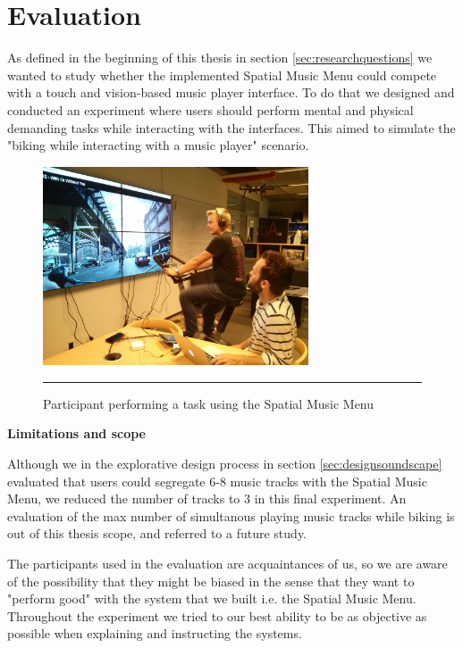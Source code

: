 \chapter{Evaluation}
\label{sec:evaluation}
As defined in the beginning of this thesis in section \ref{sec:researchquestions} we wanted to study whether the implemented Spatial Music Menu could compete with a touch and vision-based music player interface. To do that we designed and conducted an experiment where users should perform mental and physical demanding tasks while interacting with the interfaces. This aimed to simulate the "biking while interacting with a music player" scenario.

\begin{figure}[h]
	\centering
		\includegraphics[width=0.7\textwidth,height=\textheight,keepaspectratio]{./Figures/evaluation_spatial.jpg}
		\rule{35em}{1pt}
	\caption[Evaluation Spatial Music Menu]{Participant performing a task using the Spatial Music Menu}
	\label{fig:evalspatial}
\end{figure}

\textbf{Limitations and scope}

Although we in the explorative design process in section \ref{sec:designsoundscape} evaluated that users could segregate 6-8 music tracks with the Spatial Music Menu, we reduced the number of tracks to 3 in this final experiment. An evaluation of the max number of simultanous playing music tracks while biking is out of this thesis scope, and referred to a future study.

The participants used in the evaluation are acquaintances of us, so we are aware of the possibility that they might be biased in the sense that they want to "perform good" with the system that we built i.e. the Spatial Music Menu. Throughout the experiment we tried to our best ability to be as objective as possible when explaining and instructing the systems.



